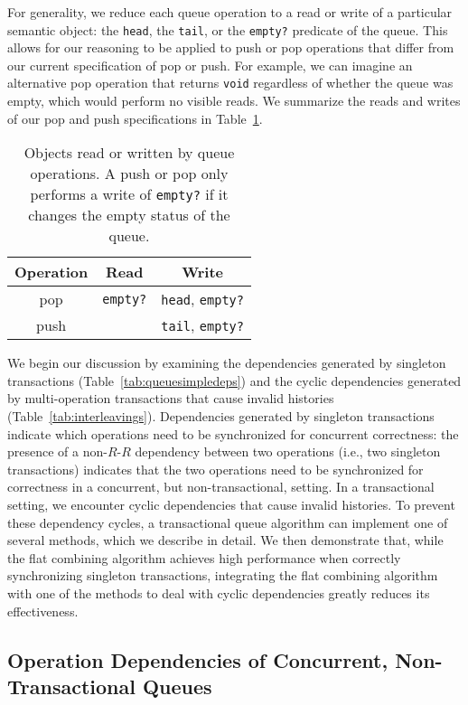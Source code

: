 For generality, we reduce each queue operation to a read or write of a particular semantic object: the \texttt{head}, the \texttt{tail}, or the \texttt{empty?} predicate of the queue. This allows for our reasoning to be applied to push or pop operations that differ from our current specification of pop or push. For example, we can imagine an alternative pop operation that returns \texttt{void} regardless of whether the queue was empty, which would perform no visible reads. We summarize the reads and writes of our pop and push specifications in Table~\ref{table:qrw}.

\begin{table}[t]
\centering
\begin{tabular}{c||c|c}
    Operation & Read & Write\\
    \hline
    pop & \texttt{empty?} & \texttt{head}, \texttt{empty?}\\
    push & & \texttt{tail}, \texttt{empty?}\\
\end{tabular}
    \caption[Objects read or written by queue operations]{Objects read or written by queue operations. A push or pop only performs a write of \texttt{empty?} if it changes the empty status of the queue.}
    \label{table:qrw}
\end{table}

We begin our discussion by examining the dependencies generated by singleton transactions (Table~\ref{tab:queuesimpledeps}) and the cyclic dependencies generated by multi-operation transactions that cause invalid histories (Table~\ref{tab:interleavings}). 
Dependencies generated by singleton transactions indicate which operations need to be synchronized for concurrent correctness: the presence of a non-$R$-$R$ dependency between two operations (i.e., two singleton transactions) indicates that the two operations need to be synchronized for correctness in a concurrent, but non-transactional, setting.
In a transactional setting, we encounter cyclic dependencies that cause invalid histories. To prevent these dependency cycles, a transactional queue algorithm can implement one of several methods, which we describe in detail.
We then demonstrate that, while the flat combining algorithm achieves high performance when correctly synchronizing singleton transactions, integrating the flat combining algorithm with one of the methods to deal with cyclic dependencies greatly reduces its effectiveness.

\subsection{Operation Dependencies of Concurrent, Non-Transactional Queues}

